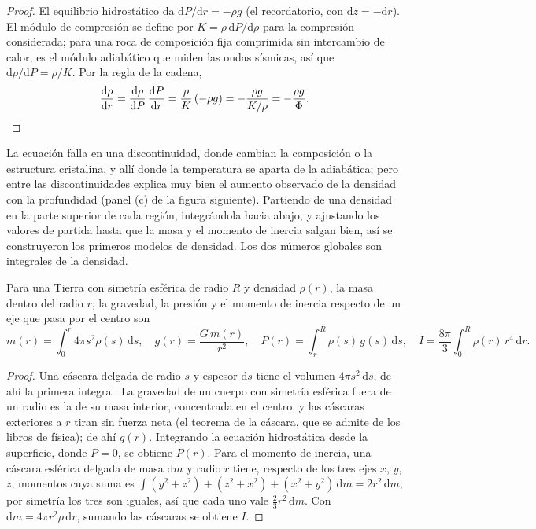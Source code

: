 \begin{proof}
El equilibrio hidrostático da $\mathrm dP/\mathrm dr = -\rho g$ (el recordatorio, con $\mathrm dz = -\mathrm dr$). El módulo
de compresión se define por $K = \rho\,\mathrm dP/\mathrm d\rho$ para la compresión considerada; para una roca de composición
fija comprimida sin intercambio de calor, es el módulo adiabático que miden las ondas sísmicas, así que
$\mathrm d\rho/\mathrm dP = \rho/K$. Por la regla de la cadena,
\[
  \frac{\mathrm d\rho}{\mathrm dr} = \frac{\mathrm d\rho}{\mathrm dP}\,
  \frac{\mathrm dP}{\mathrm dr} = \frac{\rho}{K}\,(-\rho g) = -\frac{\rho g}{K/\rho}
  = -\frac{\rho g}{\Phi}. \qedhere
\]
\end{proof}

La ecuación falla en una discontinuidad, donde cambian la composición o la estructura cristalina, y allí donde la temperatura se
aparta de la adiabática; pero entre las discontinuidades explica muy bien el aumento observado de la densidad con la profundidad
(panel (c) de la figura siguiente). Partiendo de una densidad en la parte superior de cada región, integrándola hacia abajo, y
ajustando los valores de partida hasta que la masa y el momento de inercia salgan bien, así se construyeron los primeros modelos
de densidad. Los dos números globales son integrales de la densidad.

\begin{proposition}
\label{prop:b1:layered-earth:integrals}
Para una Tierra con simetría esférica de radio $R$ y densidad $\rho(r)$, la masa dentro del radio $r$, la gravedad, la presión y el
momento de inercia respecto de un eje que pasa por el centro son
\[
  m(r) = \int_0^r 4\pi s^2\rho(s)\,\mathrm ds, \quad
  g(r) = \frac{G\,m(r)}{r^2}, \quad
  P(r) = \int_r^R \rho(s)\,g(s)\,\mathrm ds, \quad
  I = \frac{8\pi}{3}\int_0^R \rho(r)\,r^4\,\mathrm dr.
\]
\end{proposition}

\begin{proof}
Una cáscara delgada de radio $s$ y espesor $\mathrm ds$ tiene el volumen $4\pi s^2\,\mathrm ds$, de ahí la primera integral. La
gravedad de un cuerpo con simetría esférica fuera de un radio es la de su masa interior, concentrada en el centro, y las cáscaras
exteriores a $r$ tiran sin fuerza neta (el teorema de la cáscara, que se admite de los libros de física); de ahí $g(r)$. Integrando
la ecuación hidrostática desde la superficie, donde $P = 0$, se obtiene $P(r)$. Para el momento de inercia, una cáscara esférica
delgada de masa $\mathrm dm$ y radio $r$ tiene, respecto de los tres ejes $x$, $y$, $z$, momentos cuya suma es
$\int (y^2 + z^2) + (z^2 + x^2) + (x^2 + y^2)\,\mathrm dm = 2r^2\,\mathrm dm$; por simetría los tres son iguales, así que cada uno vale
$\tfrac23 r^2\,\mathrm dm$. Con $\mathrm dm = 4\pi r^2\rho\,\mathrm dr$, sumando las cáscaras se obtiene $I$.
\end{proof}

